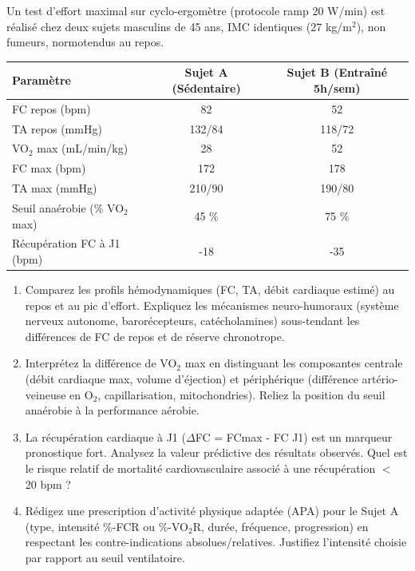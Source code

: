 \documentclass[11pt]{article}
\begin{document}
\begin{exercice}
Un test d'effort maximal sur cyclo-ergomètre (protocole ramp 20 W/min) est réalisé chez deux sujets masculins de 45 ans, IMC identiques (27 kg/m$^2$), non fumeurs, normotendus au repos.
\begin{center}
\begin{tabular}{|l|c|c|}
\hline
Paramètre & Sujet A (Sédentaire) & Sujet B (Entraîné 5h/sem) \\ \hline
FC repos (bpm) & 82 & 52 \\
TA repos (mmHg) & 132/84 & 118/72 \\
VO$_{2}$ max (mL/min/kg) & 28 & 52 \\
FC max (bpm) & 172 & 178 \\
TA max (mmHg) & 210/90 & 190/80 \\
Seuil anaérobie (\% VO$_{2}$ max) & 45 \% & 75 \% \\
Récupération FC à J1 (bpm) & -18 & -35 \\ \hline
\end{tabular}
\end{center}
\begin{enumerate}
    \item Comparez les profils hémodynamiques (FC, TA, débit cardiaque estimé) au repos et au pic d'effort. Expliquez les mécanismes neuro-humoraux (système nerveux autonome, barorécepteurs, catécholamines) sous-tendant les différences de FC de repos et de réserve chronotrope.
    \item Interprétez la différence de VO$_{2}$ max en distinguant les composantes centrale (débit cardiaque max, volume d'éjection) et périphérique (différence artério-veineuse en O$_2$, capillarisation, mitochondries). Reliez la position du seuil anaérobie à la performance aérobie.
    \item La récupération cardiaque à J1 ($\Delta$FC = FCmax - FC J1) est un marqueur pronostique fort. Analysez la valeur prédictive des résultats observés. Quel est le risque relatif de mortalité cardiovasculaire associé à une récupération $<$ 20 bpm ?
    \item Rédigez une prescription d'activité physique adaptée (APA) pour le Sujet A (type, intensité \%-FCR ou \%-VO$_{2}$R, durée, fréquence, progression) en respectant les contre-indications absolues/relatives. Justifiez l'intensité choisie par rapport au seuil ventilatoire.
\end{enumerate}
\end{exercice}
\end{document}
